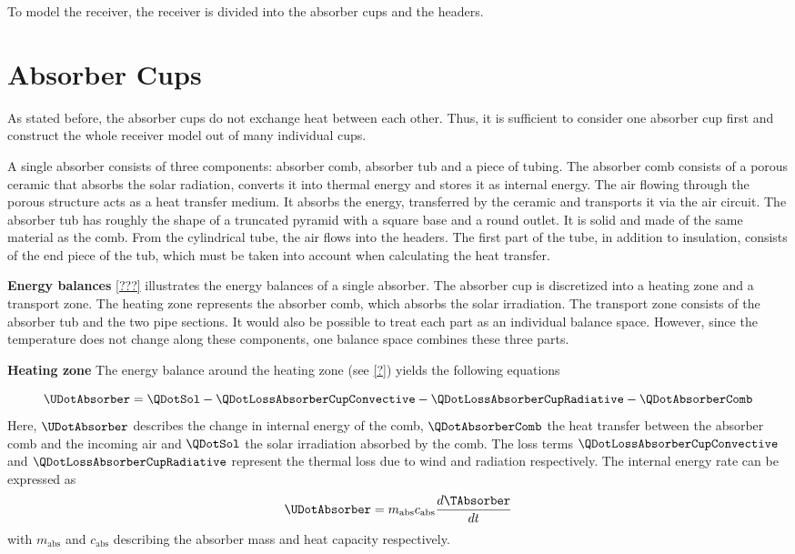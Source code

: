 To model the receiver, the receiver is divided into the absorber cups and the headers.

\section{Absorber Cups}

As stated before, the absorber cups do not exchange heat between each other.
Thus, it is sufficient to consider one absorber cup first and construct the whole receiver model out of many individual cups.

A single absorber consists of three components: absorber comb, absorber tub and a piece of tubing.
The absorber comb consists of a porous ceramic that absorbs the solar radiation, converts it into thermal energy and stores it as internal energy.
The air flowing through the porous structure acts as a heat transfer medium.
It absorbs the energy, transferred by the ceramic and transports it via the air circuit.
The absorber tub has roughly the shape of a truncated pyramid with a square base and a round outlet.
It is solid and made of the same material as the comb.
From the cylindrical tube, the air flows into the headers.
The first part of the tube, in addition to insulation, consists of the end piece of the tub, which must be taken into account when calculating the heat transfer.

\textbf{Energy balances}
\cref{???} illustrates the energy balances of a single absorber.
The absorber cup is discretized into a heating zone and a transport zone.
The heating zone represents the absorber comb, which absorbs the solar irradiation.
The transport zone consists of the absorber tub and the two pipe sections.
It would also be possible to treat each part as an individual balance space.
However, since the temperature does not change along these components, one balance space combines these three parts.

\textbf{Heating zone}
The energy balance around the heating zone (see \cref{?}) yields the following equations

\begin{equation}
\UDotAbsorber =\QDotSol - \QDotLossAbsorberCupConvective -  \QDotLossAbsorberCupRadiative -\QDotAbsorberComb
\label{eq:UDotAbsorber}
\end{equation}
Here, \(\UDotAbsorber\) describes the change in internal energy of the comb, \(\QDotAbsorberComb\) the heat transfer between the absorber comb and the incoming air and \(\QDotSol\) the solar irradiation absorbed by the comb.
The loss terms \(\QDotLossAbsorberCupConvective\) and \(\QDotLossAbsorberCupRadiative\) represent the thermal loss due to wind and radiation respectively.
The internal energy rate can be expressed as
\begin{equation}
    \UDotAbsorber = m_{\mathrm{abs}}  c_{\mathrm{abs}} \frac{d \TAbsorber}{d t}
\end{equation}
with \(m_{\mathrm{abs}}\) and \(c_{\mathrm{abs}}\) describing the absorber mass and heat capacity respectively.

